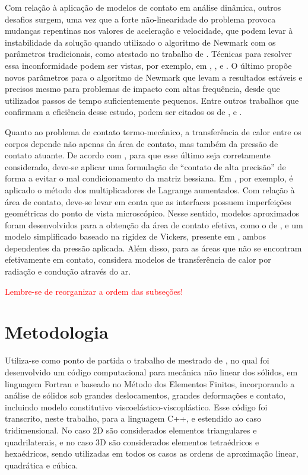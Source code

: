 \documentclass[Tese.tex]{subfiles}
\begin{document}
Com relação à aplicação de modelos de contato em análise dinâmica, outros desafios surgem, uma vez que a forte não-linearidade do problema provoca mudanças repentinas nos valores de aceleração e velocidade, que podem levar à instabilidade da solução quando utilizado o algoritmo de Newmark com os parâmetros tradicionais, como atestado no trabalho de . Técnicas para resolver essa inconformidade podem ser vistas, por exemplo, em , ,  e . O último propõe novos parâmetros para o algoritmo de Newmark que levam a resultados estáveis e precisos mesmo para problemas de impacto com altas frequência, desde que utilizados passos de tempo suficientemente pequenos. Entre outros trabalhos que confirmam a eficiência desse estudo, podem ser citados os de ,  e .

Quanto ao problema de contato termo-mecânico, a transferência de calor entre os corpos depende não apenas da área de contato, mas também da pressão de contato atuante. De acordo com , para que esse último seja corretamente considerado, deve-se aplicar uma formulação de ``contato de alta precisão'' de forma a evitar o mal condicionamento da matriz hessiana. Em , por exemplo, é aplicado o método dos multiplicadores de Lagrange aumentados. Com relação à área de contato, deve-se levar em conta que as interfaces possuem imperfeições geométricas do ponto de vista microscópico. Nesse sentido, modelos aproximados foram desenvolvidos para a obtenção da área de contato efetiva, como o de , e um modelo simplificado baseado na rigidez de Vickers, presente em , ambos dependentes da pressão aplicada. Além disso, para as áreas que não se encontram efetivamente em contato,  considera modelos de transferência de calor por radiação e condução através do ar. 

\textcolor{red}{Lembre-se de reorganizar a ordem das subseções!}

\section{Metodologia}\label{sec:metodologia}


Utiliza-se como ponto de partida o trabalho de mestrado de , no qual foi desenvolvido um código computacional para mecânica não linear dos sólidos, em linguagem Fortran e baseado no Método dos Elementos Finitos, incorporando a análise de sólidos sob grandes deslocamentos, grandes deformações e contato, incluindo modelo constitutivo viscoelástico-viscoplástico. Esse código foi transcrito, neste trabalho, para a linguagem C++, e estendido ao caso tridimensional. No caso 2D são considerados elementos triangulares e quadrilaterais, e no caso 3D são considerados elementos tetraédricos e hexaédricos, sendo utilizadas em todos os casos as ordens de aproximação linear, quadrática e cúbica.
\end{document}
